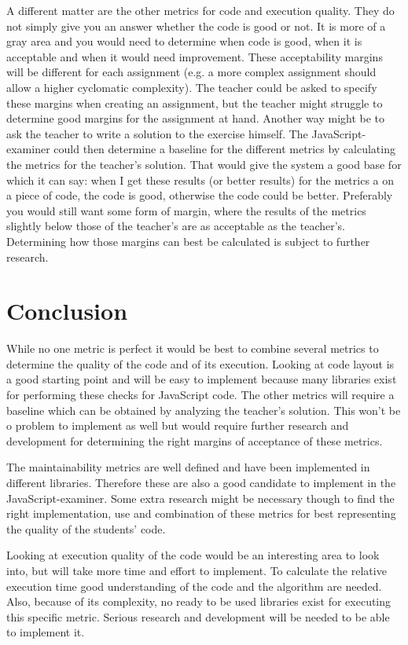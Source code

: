 \documentclass{article}
\begin{document}
A different matter are the other metrics for code and execution quality. They
do not simply give you an answer whether the code is good or not. It is more of
a gray area and you would need to determine when code is good, when it is
acceptable and when it would need improvement. These acceptability margins will
be different for each assignment (e.g. a more complex assignment should allow a
higher cyclomatic complexity). The teacher could be asked to specify these
margins when creating an assignment, but the teacher might struggle to
determine good margins for the assignment at hand. Another way might be to ask
the teacher to write a solution to the exercise himself. The
JavaScript-examiner could then determine a baseline for the different metrics
by calculating the metrics for the teacher's solution. That would give the
system a good base for which it can say: when I get these results (or better
results) for the metrics a on a piece of code, the code is good, otherwise the
code could be better. Preferably you would still want some form of margin,
where the results of the metrics slightly below those of the teacher's are as
acceptable as the teacher's. Determining how those margins can best be
calculated is subject to further research.

\section{Conclusion}

While no one metric is perfect it would be best to combine several metrics to
determine the quality of the code and of its execution. Looking at code layout
is a good starting point and will be easy to implement because many libraries
exist for performing these checks for JavaScript code. The other metrics will
require a baseline which can be obtained by analyzing the teacher's
solution. This won't be o problem to implement as well but would require
further research and development for determining the right margins of
acceptance of these metrics.

The maintainability metrics are well defined and have been implemented in
different libraries. Therefore these are also a good candidate to implement in
the JavaScript-examiner. Some extra research might be necessary though to find
the right implementation, use and combination of these metrics for best
representing the quality of the students' code.

Looking at execution quality of the code would be an interesting area to look
into, but will take more time and effort to implement. To calculate the
relative execution time good understanding of the code and the algorithm are
needed. Also, because of its complexity, no ready to be used libraries exist
for executing this specific metric. Serious research and development will be
needed to be able to implement it.
\end{document}
